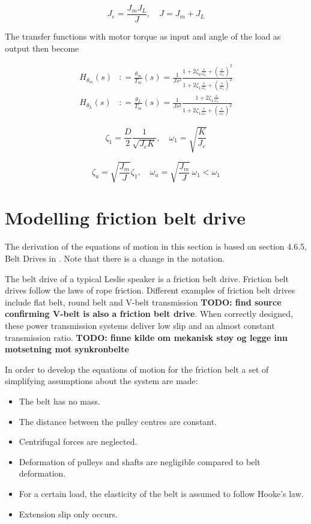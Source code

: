 \begin{equation}
	J_e = \frac{J_m J_L}{J}, \quad J = J_m + J_L
	\label{eq:Je}
\end{equation}

The transfer functions with motor torque as input and angle of the load as output then become

\begin{align}
	H_{\theta_m}(s) & : = \frac{\theta_m}{T_m}(s) = \frac{1}{Js^2}
	\frac{1 + 2\zeta_a\frac{s}{\omega_a} + \left(\frac{s}{\omega_a}\right)^2}
	{1 + 2\zeta_1\frac{s}{\omega_1} + \left(\frac{s}{\omega_1}\right)^2}
	\label{eq:Htheta-m}                                            \\[6pt]
	H_{\theta_L}(s) & : = \frac{\theta_L}{T_m}(s) = \frac{1}{Js^2}
	\frac{1 + 2\zeta_1\frac{s}{\omega_1}}
	{1 + 2\zeta_1\frac{s}{\omega_1} + \left(\frac{s}{\omega_1}\right)^2}
	\label{eq:Htheta-L}
\end{align}

\begin{equation}
	\zeta_1 = \frac{D}{2}\frac{1}{\sqrt{J_e K}}, \quad \omega_1 = \sqrt{\frac{K}{J_e}}
	\label{eq:zeta1-omega1}
\end{equation}

\begin{equation}
	\zeta_a = \sqrt{\frac{J_m}{J}}\zeta_1, \quad \omega_a = \sqrt{\frac{J_m}{J}}\,\omega_1 < \omega_1
	\label{eq:zeta-a-omega-a}
\end{equation}


\section{Modelling friction belt drive}
The derivation of the equations of motion in this section is based on section 4.6.5, Belt Drives in \cite{isermann2005mechatronic}. Note that there is a change in the notation.

The belt drive of a typical Leslie speaker is a friction belt drive.
Friction belt drives follow the laws of rope friction. Different examples of friction belt drives include flat belt, round belt and V-belt transmission \textbf{TODO: find source confirming V-belt is also a friction belt drive}. When correctly designed, these power transmission systems deliver low slip and an almost constant transmission ratio. \textbf{TODO: finne kilde om mekanisk støy og legge inn motsetning mot synkronbelte}

In order to develop the equations of motion for the friction belt a set of simplifying assumptions about the system are made:
\begin{itemize}
	\item The belt has no mass.
	\item The distance between the pulley centres are constant.
	\item Centrifugal forces are neglected.
	\item Deformation of pulleys and shafts are negligible compared to belt deformation.
	\item For a certain load, the elasticity of the belt is assumed to follow Hooke's law.
	\item Extension slip only occurs.
\end{itemize}

